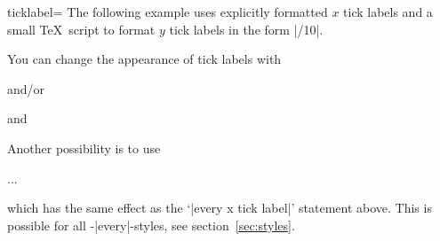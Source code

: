 \begin{pgfplotsxykey}{\x ticklabel=}
The following example uses explicitly formatted $x$ tick labels and a small \TeX\ script to format $y$ tick labels in the form |/10|.
\begin{codeexample}[]
\end{codeexample}

You can change the appearance of tick labels with
\begin{codeexample}
\end{codeexample}
and/or
\begin{codeexample}
\end{codeexample}
and
\begin{codeexample}
\end{codeexample}
Another possibility is to use 
\begin{codeexample}
\begin{axis}[y tick label style={above,
	/pgf/number format/fixed zerofill}
]
...
\end{axis}
\end{codeexample}
which has the same effect as the `|every x tick label|' statement above. This is possible for all \PGFPlots-|every|-styles, see section~\ref{sec:styles}.
\end{pgfplotsxykey}

